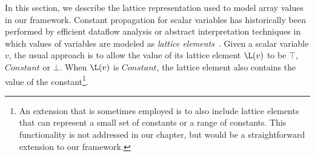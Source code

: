 
In this section, we describe the lattice representation used to model
array values in our framework.
Constant propagation for scalar variables has historically been performed
by efficient dataflow analysis
or
abstract interpretation techniques in which values of variables are
modeled as {\it lattice elements}~\cite{Kild73,WeZa91}.
Given a scalar variable $v$,
the usual approach is to allow
the value of its lattice element
$\L(v)$ to be $\top$, $Constant$ or
$\bot$.  When $\L(v)$ is $Constant$, the lattice
element also contains the value of
the constant\footnote{
An extension that is sometimes employed is to also include
lattice elements that can represent a
small set of constants or a range of constants\cite{Harr77}.
This functionality is not addressed in our chapter, but would be
a straightforward extension to our framework.}.

